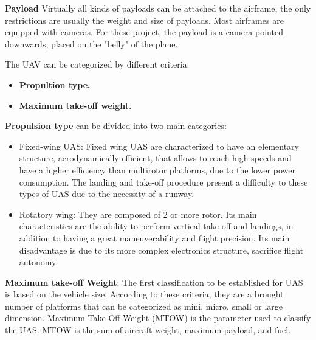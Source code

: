 \textbf{Payload} Virtually all kinds of payloads can be attached to the airframe, the only restrictions are usually the weight and size of payloads. Most airframes are equipped with cameras. For these project, the payload is a camera pointed downwards, placed on the "belly" of the plane. 

The UAV can be categorized by different criteria: 
\begin{itemize}
    \item \textbf{Propultion type.}
    \item  \textbf{Maximum take-off weight.}
\end{itemize}
\textbf{Propulsion type} can be divided into two main categories:
\begin{itemize}
\item Fixed-wing UAS: Fixed wing UAS are characterized to have an elementary structure, aerodynamically efficient, that allows to reach high speeds and have a higher efficiency than multirotor platforms, due to the lower power consumption. The landing and take-off procedure present a difficulty to these types of UAS due to the necessity of a runway.
\item Rotatory wing: They are composed of 2 or more rotor. Its main characteristics are the ability to perform vertical take-off and landings, in addition to having a great maneuverability and flight precision. Its main disadvantage is due to its more complex electronics structure, sacrifice flight autonomy.\cite{Luis_Fernadno}
\end{itemize}

\textbf{Maximum take-off Weight}: The first classification to be established for UAS is based on the vehicle size. According to these criteria, they are a brought number of platforms that can be categorized as mini, micro, small or large dimension. Maximum Take-Off Weight (MTOW) is the parameter used to classify the UAS. MTOW is the sum of aircraft weight, maximum payload, and fuel.\cite{ICAO}


